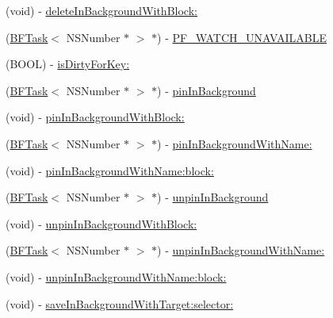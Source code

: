 \begin{DoxyCompactItemize}
\begin{DoxyCompactList}
 \end{DoxyCompactList}\item 
(void) -\/ \hyperlink{interface_p_f_object_a008e4ca6fa51b76415baa7e4f1d2a728}{delete\+In\+Background\+With\+Block\+:}
\item 
(\hyperlink{class_b_f_task}{B\+F\+Task}$<$ N\+S\+Number $\ast$ $>$ $\ast$) -\/ \hyperlink{interface_p_f_object_a2fc716d88cbd20d30e623ea4b3fa3ec2}{P\+F\+\_\+\+W\+A\+T\+C\+H\+\_\+\+U\+N\+A\+V\+A\+I\+L\+A\+B\+L\+E}
\item 
(B\+O\+O\+L) -\/ \hyperlink{interface_p_f_object_ad9c48cb7670b4f3bfeee7a249fe02c8a}{is\+Dirty\+For\+Key\+:}
\item 
(\hyperlink{class_b_f_task}{B\+F\+Task}$<$ N\+S\+Number $\ast$ $>$ $\ast$) -\/ \hyperlink{interface_p_f_object_a3417d5786dc4318bfcbbfcd7972ded19}{pin\+In\+Background}
\begin{DoxyCompactList}\small\item\em 

 \end{DoxyCompactList}\item 
(void) -\/ \hyperlink{interface_p_f_object_a572cc02e2a8b90d9ed7ed2f0154f8b13}{pin\+In\+Background\+With\+Block\+:}
\item 
(\hyperlink{class_b_f_task}{B\+F\+Task}$<$ N\+S\+Number $\ast$ $>$ $\ast$) -\/ \hyperlink{interface_p_f_object_a81a46f04955dcb97662fddd5a5cefed8}{pin\+In\+Background\+With\+Name\+:}
\item 
(void) -\/ \hyperlink{interface_p_f_object_aa98b611d685808b71aff20c7e609f5b0}{pin\+In\+Background\+With\+Name\+:block\+:}
\item 
(\hyperlink{class_b_f_task}{B\+F\+Task}$<$ N\+S\+Number $\ast$ $>$ $\ast$) -\/ \hyperlink{interface_p_f_object_aa0a028554559b7ec8a5c5be9210a5bd0}{unpin\+In\+Background}
\begin{DoxyCompactList}\small\item\em 

 \end{DoxyCompactList}\item 
(void) -\/ \hyperlink{interface_p_f_object_a1afad63dd47ab3ad2830b998203daeef}{unpin\+In\+Background\+With\+Block\+:}
\item 
(\hyperlink{class_b_f_task}{B\+F\+Task}$<$ N\+S\+Number $\ast$ $>$ $\ast$) -\/ \hyperlink{interface_p_f_object_a741848ba8450bf365674cecced145c80}{unpin\+In\+Background\+With\+Name\+:}
\item 
(void) -\/ \hyperlink{interface_p_f_object_a1a78f1b9dd587a4a34c50f4b45097bce}{unpin\+In\+Background\+With\+Name\+:block\+:}
\item 
(void) -\/ \hyperlink{interface_p_f_object_a26f570270d7ef495ba0de01fd6518fe9}{save\+In\+Background\+With\+Target\+:selector\+:}
\begin{DoxyCompactList}\small\item\em 


\end{DoxyCompactList}
\end{DoxyCompactItemize}

